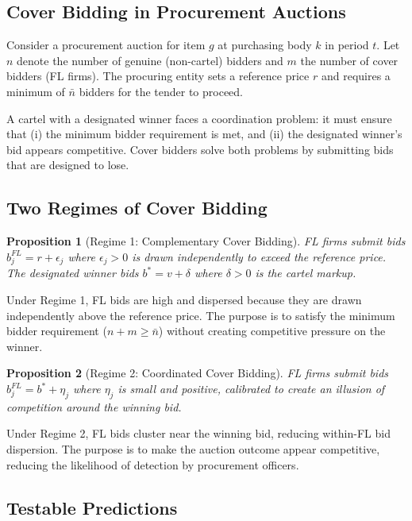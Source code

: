 \documentclass[10pt]{article}
\newtheorem{proposition}{Proposition}
\begin{document}
\subsection{Cover Bidding in Procurement Auctions}

Consider a procurement auction for item $g$ at purchasing body $k$ in period $t$. Let $n$ denote the number of genuine (non-cartel) bidders and $m$ the number of cover bidders (FL firms). The procuring entity sets a reference price $r$ and requires a minimum of $\bar{n}$ bidders for the tender to proceed.

A cartel with a designated winner faces a coordination problem: it must ensure that (i) the minimum bidder requirement is met, and (ii) the designated winner's bid appears competitive. Cover bidders solve both problems by submitting bids that are designed to lose.

\subsection{Two Regimes of Cover Bidding}

\begin{proposition}[Regime 1: Complementary Cover Bidding]
FL firms submit bids $b_j^{FL} = r + \epsilon_j$ where $\epsilon_j > 0$ is drawn independently to exceed the reference price. The designated winner bids $b^* = v + \delta$ where $\delta > 0$ is the cartel markup.
\end{proposition}

Under Regime 1, FL bids are high and dispersed because they are drawn independently above the reference price. The purpose is to satisfy the minimum bidder requirement ($n + m \geq \bar{n}$) without creating competitive pressure on the winner.

\begin{proposition}[Regime 2: Coordinated Cover Bidding]
FL firms submit bids $b_j^{FL} = b^* + \eta_j$ where $\eta_j$ is small and positive, calibrated to create an illusion of competition around the winning bid.
\end{proposition}

Under Regime 2, FL bids cluster near the winning bid, reducing within-FL bid dispersion. The purpose is to make the auction outcome appear competitive, reducing the likelihood of detection by procurement officers.

\subsection{Testable Predictions}
\end{document}
